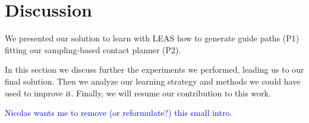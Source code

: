 \section{Discussion\label{sub:cp-sb:discussion}}
We presented our solution to learn with LEAS how to generate guide paths (P1) fitting our sampling-based contact planner (P2). 

In this section we discuss further the experiments we performed, leading us to our final solution. Then we analyze our learning strategy and methods we could have used to improve it.
Finally, we will resume our contribution to this work.

\textcolor{blue}{Nicolas wants me to remove (or reformulate?) this small intro.}


